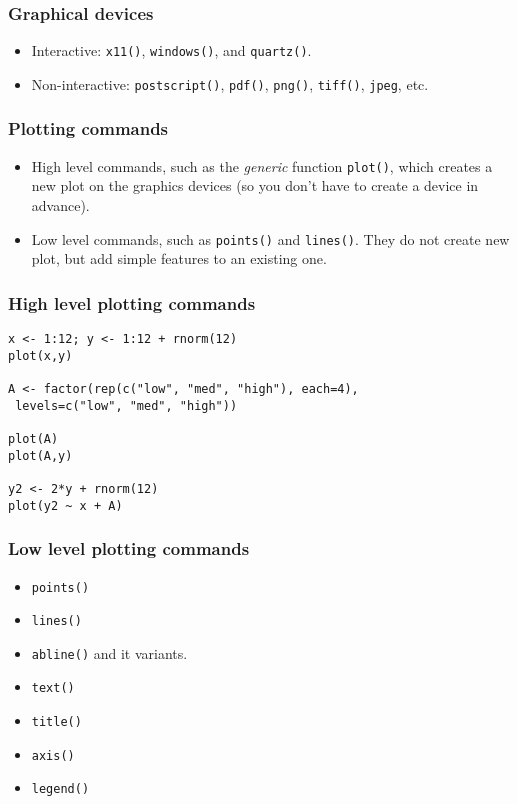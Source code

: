 \begin{frame}
  \frametitle{Graphical devices}
  \begin{itemize}
  \item Interactive: \texttt{x11()}, \texttt{windows()}, and
    \texttt{quartz()}.
  \item Non-interactive: \texttt{postscript()}, \texttt{pdf()},
    \texttt{png()}, \texttt{tiff()}, \texttt{jpeg}, etc.
  \end{itemize}
\end{frame}

\begin{frame}
  \frametitle{Plotting commands}
  \begin{itemize}
  \item High level commands, such as the \emph{generic} function
    \texttt{plot()}, which creates a new plot on the graphics devices
    (so you don't have to create a device in advance).
  \item Low level commands, such as \texttt{points()} and
    \texttt{lines()}.  They do not create new plot, but add simple
    features to an existing one.
  \end{itemize}
\end{frame}

\begin{frame}
  \frametitle{High level plotting commands}
\begin{verbatim}
x <- 1:12; y <- 1:12 + rnorm(12)
plot(x,y)

A <- factor(rep(c("low", "med", "high"), each=4),
 levels=c("low", "med", "high"))

plot(A)
plot(A,y)

y2 <- 2*y + rnorm(12)
plot(y2 ~ x + A)
\end{verbatim}
\end{frame}

\begin{frame}
  \frametitle{Low level plotting commands}
  \begin{itemize}
  \item \texttt{points()}
  \item \texttt{lines()}
  \item \texttt{abline()} and it variants.
  \item \texttt{text()}
  \item \texttt{title()}
  \item \texttt{axis()}
  \item \texttt{legend()}
  \end{itemize}
\end{frame}

